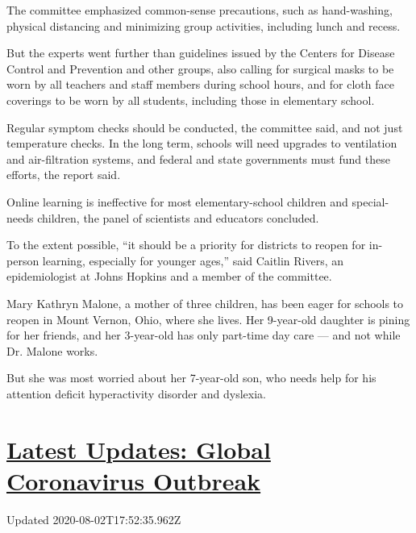 The committee emphasized common-sense precautions, such as hand-washing,
physical distancing and minimizing group activities, including lunch and
recess.

But the experts went further than guidelines issued by the Centers for
Disease Control and Prevention and other groups, also calling for
surgical masks to be worn by all teachers and staff members during
school hours, and for cloth face coverings to be worn by all students,
including those in elementary school.

Regular symptom checks should be conducted, the committee said, and not
just temperature checks. In the long term, schools will need upgrades to
ventilation and air-filtration systems, and federal and state
governments must fund these efforts, the report said.

Online learning is ineffective for most elementary-school children and
special-needs children, the panel of scientists and educators concluded.

To the extent possible, ``it should be a priority for districts to
reopen for in-person learning, especially for younger ages,'' said
Caitlin Rivers, an epidemiologist at Johns Hopkins and a member of the
committee.

Mary Kathryn Malone, a mother of three children, has been eager for
schools to reopen in Mount Vernon, Ohio, where she lives. Her 9-year-old
daughter is pining for her friends, and her 3-year-old has only
part-time day care --- and not while Dr. Malone works.

But she was most worried about her 7-year-old son, who needs help for
his attention deficit hyperactivity disorder and dyslexia.

\hypertarget{latest-updates-global-coronavirus-outbreak}{%
\section{\texorpdfstring{\href{https://www.nytimes3xbfgragh.onion/2020/08/01/world/coronavirus-covid-19.html?action=click\&pgtype=Article\&state=default\&region=MAIN_CONTENT_1\&context=storylines_live_updates}{Latest
Updates: Global Coronavirus
Outbreak}}{Latest Updates: Global Coronavirus Outbreak}}\label{latest-updates-global-coronavirus-outbreak}}

Updated 2020-08-02T17:52:35.962Z

